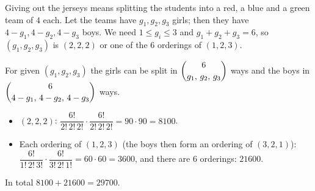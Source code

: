 Giving out the jerseys means splitting the students into a red, a blue and a green team of $4$ each. Let the teams have $g_1,g_2,g_3$ girls; then they have $4-g_1,4-g_2,4-g_3$ boys. We need $1\le g_i\le3$ and $g_1+g_2+g_3=6$, so $(g_1,g_2,g_3)$ is $(2,2,2)$ or one of the $6$ orderings of $(1,2,3)$.

For given $(g_1,g_2,g_3)$ the girls can be split in $\dbinom{6}{g_1,\,g_2,\,g_3}$ ways and the boys in $\dbinom{6}{4-g_1,\,4-g_2,\,4-g_3}$ ways.
\begin{itemize}
\item $(2,2,2)$: $\dfrac{6!}{2!\,2!\,2!}\cdot\dfrac{6!}{2!\,2!\,2!}=90\cdot90=8100$.
\item Each ordering of $(1,2,3)$ (the boys then form an ordering of $(3,2,1)$): $\dfrac{6!}{1!\,2!\,3!}\cdot\dfrac{6!}{3!\,2!\,1!}=60\cdot60=3600$, and there are $6$ orderings: $21600$.
\end{itemize}
In total $8100+21600=\boxed{29700}$.
